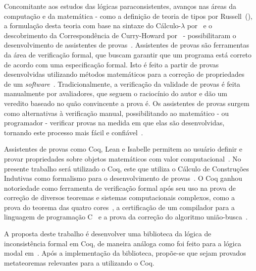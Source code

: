 Concomitante aos estudos das lógicas paraconsistentes, avanços nas áreas da computação e da matemática {-} como a definição de teoria de tipos por Russell~(\citeyear{russell1903principles,Russell1908-RUSMLA}), a formulação desta teoria com base na sintaxe do Cálculo-$\lambda$ por~ e o descobrimento da Correspondência de Curry-Howard por~ {-} possibilitaram o desenvolvimento de assistentes de provas~\cite{harrison2014history}. Assistentes de provas são ferramentas da área de verificação formal, que buscam garantir que um programa está correto de acordo com uma especificação formal. Isto é feito a partir de provas desenvolvidas utilizando métodos matemáticos para a correção de propriedades de um \textit{software}~\cite{Chlipala_2013}. Tradicionalmente, a verificação da validade de provas é feita manualmente por avaliadores, que seguem o raciocínio do autor e dão um veredito baseado no quão convincente a prova é. Os assistentes de provas surgem como alternativas à verificação manual, possibilitando ao matemático {-} ou programador {-} verificar provas na medida em que elas são desenvolvidas, tornando este processo mais fácil e confiável~\cite{paulinmohring:hal-01094195}.

Assistentes de provas como Coq, Lean e Isabelle permitem ao usuário definir e provar propriedades sobre objetos matemáticos com valor computacional~\cite{geuvers2009proof}. No presente trabalho será utilizado o Coq, este que utiliza o Cálculo de Construções Indutivas como formalismo para o desenvolvimento de provas~\cite{TEAM_2024}. O Coq ganhou notoriedade como ferramenta de verificação formal após seu uso na prova de correção de diversos teoremas e sistemas computacionais complexos, como a prova do teorema das quatro cores~\cite{geuvers2009proof}, a certificação de um compilador para a linguagem de programação C~\cite{leroy2021compcert} e a prova da correção do algoritmo união-busca~\cite{union-find}.

A proposta deste trabalho é desenvolver uma biblioteca da lógica de inconsistência formal \lfium{} em Coq, de maneira análoga como foi feito para a lógica modal em~. Após a implementação da biblioteca, propõe-se que sejam provados metateoremas relevantes para a \lfium{} utilizando o Coq.



